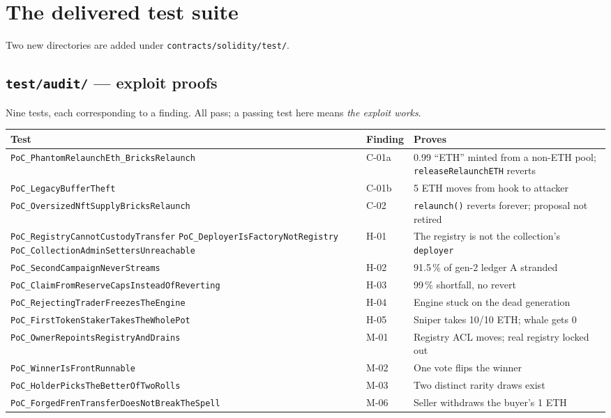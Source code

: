 \documentclass[10pt,a4paper]{article}
\newcommand{\code}[1]{\texttt{\small #1}}
\begin{document}
\section{The delivered test suite}
\label{sec:tests}

Two new directories are added under \code{contracts/solidity/test/}.

\subsection{\texttt{test/audit/} --- exploit proofs}

Nine tests, each corresponding to a finding. All pass; a passing test here means
\emph{the exploit works}.

\begin{center}\small
\begin{tabular}{@{}p{}p{}p{}@{}}
\toprule
\textbf{Test} & \textbf{Finding} & \textbf{Proves} \\
\midrule
\code{PoC\_PhantomRelaunchEth\_BricksRelaunch} & C-01a & 0.99 ``ETH'' minted from a non-ETH pool; \code{releaseRelaunchETH} reverts \\
\code{PoC\_LegacyBufferTheft}                  & C-01b & 5 ETH moves from hook to attacker \\
\code{PoC\_OversizedNftSupplyBricksRelaunch}   & C-02  & \code{relaunch()} reverts forever; proposal not retired \\
\code{PoC\_RegistryCannotCustodyTransfer} \newline \code{PoC\_DeployerIsFactoryNotRegistry} \newline \code{PoC\_CollectionAdminSettersUnreachable} & H-01 & The registry is not the collection's \code{deployer} \\
\code{PoC\_SecondCampaignNeverStreams}         & H-02  & 91.5\,\% of gen-2 ledger A stranded \\
\code{PoC\_ClaimFromReserveCapsInsteadOfReverting} & H-03 & 99\,\% shortfall, no revert \\
\code{PoC\_RejectingTraderFreezesTheEngine}    & H-04  & Engine stuck on the dead generation \\
\code{PoC\_FirstTokenStakerTakesTheWholePot}   & H-05  & Sniper takes 10/10 ETH; whale gets 0 \\
\code{PoC\_OwnerRepointsRegistryAndDrains}     & M-01  & Registry ACL moves; real registry locked out \\
\code{PoC\_WinnerIsFrontRunnable}              & M-02  & One vote flips the winner \\
\code{PoC\_HolderPicksTheBetterOfTwoRolls}     & M-03  & Two distinct rarity draws exist \\
\code{PoC\_ForgedFrenTransferDoesNotBreakTheSpell} & M-06 & Seller withdraws the buyer's 1 ETH \\
\bottomrule
\end{tabular}
\end{center}
\end{document}
